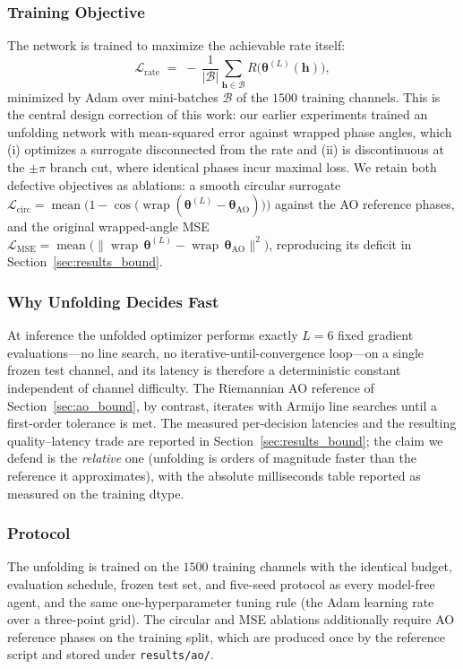 \subsubsection{Training Objective}
The network is trained to maximize the achievable rate itself:
\begin{equation}
\mathcal{L}_{\mathrm{rate}}
\;=\;
-\,\frac{1}{|\mathcal{B}|}\sum_{\boldsymbol{h} \in \mathcal{B}}
R\bigl(\boldsymbol{\theta}^{(L)}(\boldsymbol{h})\bigr),
\label{eq:rate_loss}
\end{equation}
minimized by Adam over mini-batches $\mathcal{B}$ of the $1500$ training
channels. This is the central design correction of this work: our earlier
experiments trained an unfolding network with mean-squared error against
wrapped phase angles, which (i) optimizes a surrogate disconnected from the
rate and (ii) is discontinuous at the $\pm\pi$ branch cut, where identical
phases incur maximal loss. We retain both defective objectives as ablations:
a smooth circular surrogate
$\mathcal{L}_{\mathrm{circ}} = \operatorname{mean}\bigl(1 -
\cos\bigl(\operatorname{wrap}(\boldsymbol{\theta}^{(L)} -
\boldsymbol{\theta}_{\mathrm{AO}})\bigr)\bigr)$ against the AO reference
phases, and the original wrapped-angle MSE
$\mathcal{L}_{\mathrm{MSE}} = \operatorname{mean}\bigl(\|
\operatorname{wrap}\,\boldsymbol{\theta}^{(L)} -
\operatorname{wrap}\,\boldsymbol{\theta}_{\mathrm{AO}} \|^2\bigr)$,
reproducing its deficit in Section~\ref{sec:results_bound}.

\subsubsection{Why Unfolding Decides Fast}
At inference the unfolded optimizer performs exactly $L = 6$ fixed
gradient evaluations---no line search, no iterative-until-convergence
loop---on a single frozen test channel, and its latency
is therefore a deterministic constant independent of channel difficulty. The
Riemannian AO reference of Section~\ref{sec:ao_bound}, by contrast, iterates with
Armijo line searches until a first-order tolerance is met. The measured
per-decision latencies and the resulting quality--latency trade are reported
in Section~\ref{sec:results_bound}; the claim we defend is the \emph{relative}
one (unfolding is orders of magnitude faster than the reference it approximates),
with the absolute milliseconds table reported as measured on the training
dtype.

\subsubsection{Protocol}
The unfolding is trained on the $1500$ training channels with the identical
budget, evaluation schedule, frozen test set, and five-seed protocol as every
model-free agent, and the same one-hyperparameter tuning rule (the Adam
learning rate over a three-point grid). The circular and MSE ablations
additionally require AO reference phases on the training split, which are
produced once by the reference script and stored under \texttt{results/ao/}.

